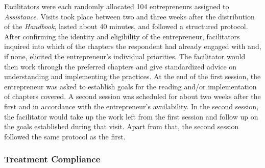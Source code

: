 \documentclass[11.5pt]{article}
\begin{document}
{Facilitators were each randomly allocated 104 entrepreneurs assigned to \emph{Assistance}. Visits took place between two and three weeks after the distribution of the \emph{Handbook}, lasted about 40 minutes, and followed a structured protocol. After confirming the identity and eligibility of the entrepreneur, facilitators inquired into which of the chapters the respondent had already engaged with and, if none, elicited the entrepreneur's individual priorities. The facilitator would then work through the preferred chapters and give standardized advice on understanding and implementing the practices. %
At the end of the first session, the entrepreneur was asked to establish goals for the reading and/or implementation of chapters covered. A second session was scheduled for about two weeks after the first and in accordance with the entrepreneur's availability. In the second session, the facilitator would take up the work left from the first session and follow up on the goals established during that visit. Apart from that, the second session followed the same protocol as the first.

\subsubsection{Treatment Compliance}

}
\end{document}
